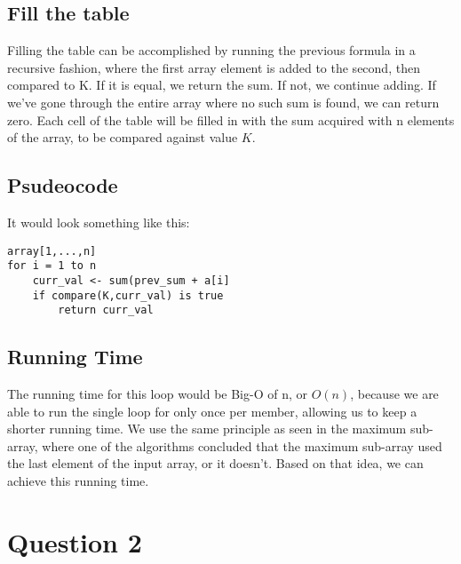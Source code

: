 \documentclass{article}
\begin{document}
\subsection{Fill the table}
Filling the table can be accomplished by running the previous formula in a recursive fashion, where the first array element is added to the second, then compared to K. If it is equal, we return the sum. If not, we continue adding. If we've gone through the entire array where no such sum is found, we can return zero. Each cell of the table will be filled in with the sum acquired with n elements of the array, to be compared against value $K$.
\subsection{Psudeocode}
It would look something like this: \newline
\begin{lstlisting}
array[1,...,n]
for i = 1 to n
	curr_val <- sum(prev_sum + a[i]
	if compare(K,curr_val) is true
		return curr_val
\end{lstlisting}
\subsection{Running Time}
The running time for this loop would be Big-O of n, or $O(n)$, because we are able to run the single loop for only once per member, allowing us to keep a shorter running time. We use the same principle as seen in the maximum sub-array, where one of the algorithms concluded that the maximum sub-array used the last element of the input array, or it doesn't. Based on that idea, we can achieve this running time.
\section{Question 2}
\end{document}
